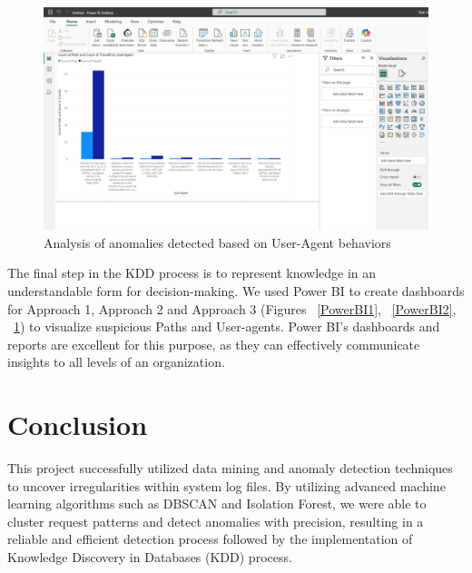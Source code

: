 \begin{figure}
	\begin{center}
		\includegraphics[width=0.7\linewidth]{Images/PowerBI3.png}
		\caption{Analysis of anomalies detected based on User-Agent behaviors}
		\label{PowerBI3} 
	\end{center}
\end{figure}

The final step in the KDD process is to represent knowledge in an understandable form for decision-making. We used Power BI to create dashboards for Approach 1, Approach 2 and Approach 3 (Figures ~\ref{PowerBI1}, ~\ref{PowerBI2}, ~\ref{PowerBI3}) to visualize suspicious Paths and User-agents. Power BI's dashboards and reports are excellent for this purpose, as they can effectively communicate insights to all levels of an organization.

\section{Conclusion}
This project successfully utilized data mining and anomaly detection techniques to uncover irregularities within system log files. By utilizing advanced machine learning algorithms such as DBSCAN and Isolation Forest, we were able to cluster request patterns and detect anomalies with precision, resulting in a reliable and efficient detection process followed by the implementation of  Knowledge Discovery in Databases (KDD) process.
